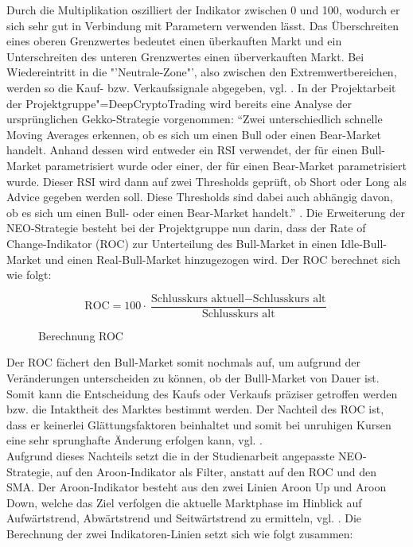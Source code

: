 Durch die Multiplikation oszilliert der Indikator zwischen 0 und 100, wodurch er sich sehr gut in Verbindung mit Parametern verwenden lässt. Das Überschreiten eines oberen Grenzwertes bedeutet einen überkauften Markt und ein Unterschreiten des unteren Grenzwertes einen überverkauften Markt. Bei Wiedereintritt in die "'Neutrale-Zone"', also zwischen den Extremwertbereichen, werden so die Kauf- bzw. Verkaufssignale abgegeben, vgl. \cite{ber20}. In der Projektarbeit der Projektgruppe"=DeepCryptoTrading wird bereits eine Analyse der ursprünglichen Gekko-Strategie vorgenommen: "`Zwei unterschiedlich schnelle Moving Averages erkennen, ob es sich um einen Bull oder einen Bear-Market handelt. Anhand dessen wird entweder ein RSI verwendet, der für einen Bull-Market parametrisiert wurde oder einer, der für einen Bear-Market parametrisiert wurde. Dieser RSI wird dann auf zwei Thresholds geprüft, ob Short oder Long als Advice gegeben werden soll. Diese Thresholds sind dabei auch abhängig davon, ob es sich um einen Bull- oder einen Bear-Market handelt."' \cite{pro19}. Die Erweiterung der NEO-Strategie besteht bei der Projektgruppe nun darin, dass der Rate of Change-Indikator (ROC) zur Unterteilung des Bull-Market in einen Idle-Bull-Market und einen Real-Bull-Market hinzugezogen wird. Der ROC berechnet sich wie folgt: \\ 

\begin{figure}
\begin{equation*}
\text{ROC}=100\cdot\frac{\text{Schlusskurs aktuell}- \text{Schlusskurs alt}}{\text{Schlusskurs alt}}
\end{equation*}
\caption{Berechnung ROC}
\end{figure}


Der ROC fächert den Bull-Market somit nochmals auf, um aufgrund der Veränderungen unterscheiden zu können, ob der Bulll-Market von Dauer ist. Somit kann die Entscheidung des Kaufs oder Verkaufs präziser getroffen werden bzw. die Intaktheit des Marktes bestimmt werden. Der Nachteil des ROC ist, dass er keinerlei Glättungsfaktoren beinhaltet und somit bei unruhigen Kursen eine sehr sprunghafte Änderung erfolgen kann, vgl. \cite{tra20}.\\

Aufgrund dieses Nachteils setzt die in der Studienarbeit angepasste NEO-Strategie, auf den Aroon-Indikator als Filter, anstatt auf den ROC und den SMA. Der Aroon-Indikator besteht aus den zwei Linien Aroon Up und Aroon Down, welche das Ziel verfolgen die aktuelle Marktphase im Hinblick auf Aufwärtstrend, Abwärtstrend und Seitwärtstrend zu ermitteln, vgl. \cite{ber201}. Die Berechnung der zwei Indikatoren-Linien setzt sich wie folgt zusammen: \\

